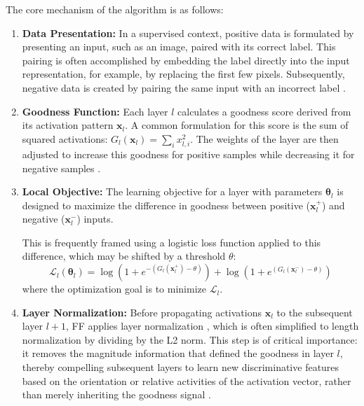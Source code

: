 The core mechanism of the algorithm is as follows:
\begin{enumerate}
    \item \textbf{Data Presentation:} In a supervised context, positive data is formulated by presenting an input, such as an image, paired with its correct label. This pairing is often accomplished by embedding the label directly into the input representation, for example, by replacing the first few pixels. Subsequently, negative data is created by pairing the same input with an incorrect label \cite{hinton2022forward}.
    \item \textbf{Goodness Function:} Each layer $l$ calculates a goodness score derived from its activation pattern $\mathbf{x}_l$. A common formulation for this score is the sum of squared activations: $G_l(\mathbf{x}_l) = \sum_i x_{l,i}^2$. The weights of the layer are then adjusted to increase this goodness for positive samples while decreasing it for negative samples \cite{hinton2022forward}.
    \item \textbf{Local Objective:} The learning objective for a layer with parameters $\boldsymbol{\theta}_l$ is designed to maximize the difference in goodness between positive ($\mathbf{x}_l^+$) and negative ($\mathbf{x}_l^-$) inputs. 

This is frequently framed using a logistic loss function applied to this difference, which may be shifted by a threshold $\theta$:
        \begin{equation}
        \mathcal{L}_l(\boldsymbol{\theta}_l) = \log(1 + e^{-(G_l(\mathbf{x}_l^+) - \theta)}) + \log(1 + e^{(G_l(\mathbf{x}_l^-) - \theta)})
        \tag{2.6} \label{eq:ff_loss_chap2}
        \end{equation}
        where the optimization goal is to minimize $\mathcal{L}_l$.
    \item \textbf{Layer Normalization:} Before propagating activations $\mathbf{x}_l$ to the subsequent layer $l+1$, FF applies layer normalization \cite{ba2016layer}, which is often simplified to length normalization by dividing by the L2 norm. This step is of critical importance: it removes the magnitude information that defined the goodness in layer $l$, thereby compelling subsequent layers to learn new discriminative features based on the orientation or relative activities of the activation vector, rather than merely inheriting the goodness signal \cite{hinton2022forward}.
\end{enumerate}

